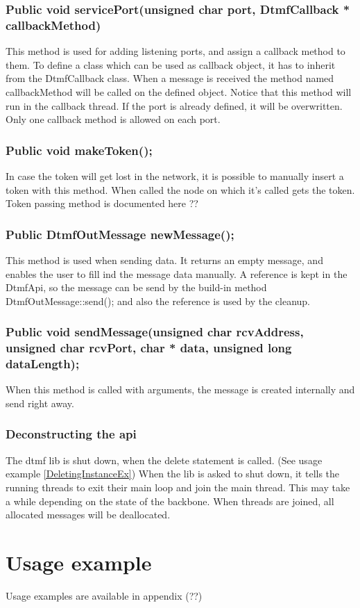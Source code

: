 \subsubsection*{Public void servicePort(unsigned char port, DtmfCallback * callbackMethod)}
This method is used for adding listening ports, and assign a callback method to them. To define a class which can be used as callback object, it has to inherit from the DtmfCallback class. When a message is received the method named callbackMethod will be called on the defined object. Notice that this method will run in the callback thread. If the port is already defined, it will be overwritten. Only one callback method is allowed on each port.

\subsubsection*{Public void makeToken();}
In case the token will get lost in the network, it is possible to manually insert a token with this method. When called the node on which it's called gets the token. Token passing method is documented here ??

\subsubsection*{Public DtmfOutMessage newMessage();}
This method is used when sending data. It returns an empty message, and enables the user to fill ind the message data manually. A reference is kept in the DtmfApi, so the message can be send by the build-in method DtmfOutMessage::send(); and also the reference is used by the cleanup.

\subsubsection*{Public void sendMessage(unsigned char rcvAddress, unsigned char rcvPort, char * data, unsigned long dataLength);}
When this method is called with arguments, the message is created internally and send right away.

\subsubsection*{Deconstructing the api}
The dtmf lib is shut down, when the delete statement is called. (See usage example \ref{DeletingInstanceEx}) When the lib is asked to shut down, it tells the running threads to exit their main loop and join the main thread. This may take a while depending on the state of the backbone. When threads are joined, all allocated messages will be deallocated.

\section{Usage example}
Usage examples are available in appendix (??)

